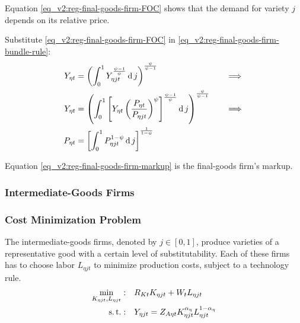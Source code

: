 \documentclass[../thesis.tex]{subfiles}
\begin{document}
Equation \ref{eq_v2:reg-final-goods-firm-FOC} shows that the demand for variety $j$ depends on its relative price. 

Substitute \ref{eq_v2:reg-final-goods-firm-FOC} in \ref{eq_v2:reg-final-goods-firm-bundle-rule}:
\begin{alignat}{2}
	Y_{\eta t} & = \left( \int_{0}^{1} Y_{\eta jt}^{\frac{\psi-1}{\psi}} \operatorname{d} j \right)^{\frac{\psi}{\psi-1}} &\implies \nonumber \\
	Y_{\eta t} & = \left( \int_{0}^{1} \left[ Y_{\eta t} \left( \frac{P_{\eta t}}{P_{\eta jt}} \right)^{\psi} \right]^{\frac{\psi-1}{\psi}} \operatorname{d} j \right)^{\frac{\psi}{\psi-1}} \quad &\implies \nonumber \\
	P_{\eta t} & = \left[ \int_{0}^{1} P_{\eta jt}^{1-\psi} \operatorname{d} j \right]^{\frac{1}{1-\psi}} \label{eq_v2:reg-final-goods-firm-markup}
\end{alignat}

Equation \ref{eq_v2:reg-final-goods-firm-markup} is the final-goods firm's markup.


\subsubsection{Intermediate-Goods Firms}

\subsubsection*{Cost Minimization Problem}

The intermediate-goods firms, denoted by $j \in [0,1]$, produce varieties of a representative good with a certain level of substitutability. Each of these firms has to choose labor $L_{\eta jt}$ to minimize production costs, subject to a technology rule.
\begin{align}
	\label{eq_v2:reg-int-good-firm-total-cost}
	\min_{K_{\eta jt}, L_{\eta jt}}: \quad & R_{Kt} K_{\eta jt} + W_t L_{\eta jt} \\
	\label{eq_v2:reg-int-good-firm-prod-function}
	\operatorname{s.t.}: \quad & Y_{\eta jt} = Z_{A\eta t} K_{\eta jt}^{\alpha_{\eta}} L_{\eta jt}^{1-{\alpha_{\eta}}}
\end{align}

\begin{comment}
	
	\begin{tcolorbox}[colback=red!5!white,colframe=red!75!black]
		“We set this parameter so that profits are zero in steady state” [Adolfson et al., 2014, p. 36] 
	\end{tcolorbox}	

\end{comment}
\end{document}

